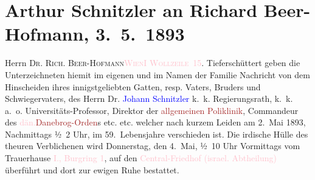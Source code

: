 

               \section[Arthur Schnitzler an Richard Beer-Hofmann, 3. 5. 1893]{ Arthur Schnitzler an Richard Beer-Hofmann, 3. 5. 1893}\nopagebreak{}\rehead{ }\normalsize\beginnumbering{} \toendnotes[C]{\smallbreak\pagebreak[2]} 
\pstart{}{\pb}Herrn \textsc{Dr. Rich.
                     Beer-Hofmann}\pend{}\pstart{}\textsc{\textcolor{pink}{Wien}{}\ledrightnote{\textcolor{pink}{Wien}}}\pend{}\pstart{}\textsc{\textcolor{pink}{I Wollzeile 15}{}\ledrightnote{\textcolor{pink}{Wollzeile}}}.\pend{}{\bigskip}\pstart
           \noindent{}{\pb}Tieferschüttert geben die Unterzeichneten hiemit im
               eigenen und im Namen der Familie Nachricht von dem Hinscheiden ihres innigstgeliebten
               Gatten, resp. Vaters, Bruders und Schwiegervaters, des Herrn\pend
           \pstart
           \centering{}Dr. \textcolor{blue}{Johann Schnitzler}{}\ledrightnote{\textcolor{blue}{Johann Schnitzler}}\pend
           \pstart
           \noindent{}\centering{}k. k. Regierungsrath, k. k. a. o. Universitäts-Professor, Direktor der
                  \textcolor{brown}{allgemeinen Poliklinik}{}\ledrightnote{\textcolor{brown}{Allgemeine Poliklinik}}, Commandeur des \textcolor{pink}{dän.}{}\ledrightnote{\textcolor{pink}{Dänemark}}{ }\textcolor{brown}{Danebrog-Orden}{}\ledrightnote{\textcolor{brown}{Dannebrogorden}}s etc. etc.\pend
           \pstart
           \noindent{}welcher nach kurzem Leiden am 2. Mai 1893, Nachmittags ½ 2
                  Uhr, im 59. Lebensjahre verschieden ist.\pend
           \pstart
           Die irdische Hülle des theuren Verblichenen wird Donnerstag, den 4. Mai,
                  ½ 10 Uhr Vormittags vom Trauerhause \textcolor{pink}{I.,
                  Burgring 1}{}\ledrightnote{\textcolor{pink}{Burgring}}, auf den \textcolor{pink}{Central-Friedhof (israel.
                  Abtheilung)}{}\ledrightnote{\textcolor{pink}{Wiener Zentralfriedhof}} überführt und dort zur ewigen Ruhe bestattet.\pend
